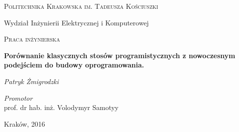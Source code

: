 \begin{titlepage}
	\centering
	{\scshape\LARGE Politechnika Krakowska 
	\break im. Tadeusza Kościuszki \par}
	\vspace{0.5cm}
	{\large Wydział Inżynierii Elektrycznej i Komputerowej\par}
	\vspace{1cm}
	{\scshape\LARGE Praca inżynierska\par}
	\vspace{1.5cm}
	{\LARGE\bfseries Porównanie klasycznych stosów programistycznych z nowoczesnym podejściem do budowy oprogramowania.\par}
	\vspace{1.5cm}
	{\LARGE\itshape Patryk Żmigrodzki\par}
	\vspace{1cm}

	\vfill
	
			\large
				\emph{Promotor}\\
				prof. dr hab. inż. Volodymyr Samotyy

	\vfill

	{\large Kraków, 2016\par}
\end{titlepage}